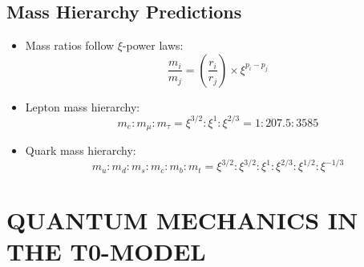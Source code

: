 \documentclass[12pt,a4paper]{article}
\begin{document}
\subsection{Mass Hierarchy Predictions}
\begin{itemize}
	\item Mass ratios follow $\xi$-power laws:
	\begin{equation}
		\frac{m_i}{m_j} = \left(\frac{r_i}{r_j}\right) \times \xi^{p_i - p_j}
	\end{equation}
	
	\item Lepton mass hierarchy:
	\begin{equation}
		m_e : m_\mu : m_\tau = \xi^{3/2} : \xi^1 : \xi^{2/3} = 1 : 207.5 : 3585
	\end{equation}
	
	\item Quark mass hierarchy:
	\begin{equation}
		m_u : m_d : m_s : m_c : m_b : m_t = \xi^{3/2} : \xi^{3/2} : \xi^1 : \xi^{2/3} : \xi^{1/2} : \xi^{-1/3}
	\end{equation}
\end{itemize}
	\section{QUANTUM MECHANICS IN THE T0-MODEL}
	
\end{document}
